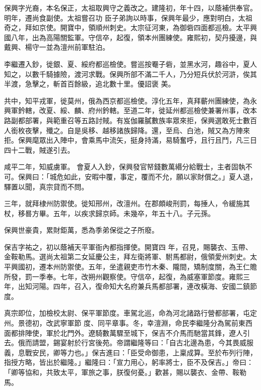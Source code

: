 \begin{pinyinscope}
 保興字光裔，本名保正，太祖取興守之義改之。建隆初，年十四，以蔭補供奉官。明年，遷尚食副使。太祖嘗召功
 臣子弟詢以時事，保興年最少，應對明白，太祖奇之，拜如京使。開寶中，領順州刺史。太宗征河東，為御砦四面都巡檢。太平興國八年，出為高陽關監軍。守信卒，起復，領本州團練使。雍熙初，契丹擾邊，與戴興、楊守一並為澶州前軍駐泊。



 李繼遷入鈔，徙銀、夏、綏府都巡檢使。嘗巡按罨子砦，並黑水河，趣谷中，夏人知之，以數千騎據險，渡河求戰。保興所部不滿二千人，乃分短兵伏於河滸，俟其半渡，急擊之，斬首百餘級，追北數十里。優詔褒
 美。



 共中，知平戎軍，徙莫州，俄為西京都巡檢使。淳化五年，真拜蘄州團練使，為永興軍鈐轄，改夏、綏、麟、府州鈐轄。至道二年，徙延州都巡檢使兼署州事，改本路副都部署，與範重召等五路討賊。有岌伽羅膩數族率眾來拒，保興選敢死士數百人銜枚夜擊，殲之。自是吳移、越移諸族歸降。還，至烏、白池，賊又為方陣來拒。保興麾眾出入陣中，會乘馬中流矢，挺身持滿，易騎奮呼，且行且鬥，凡三日四十二戰，賊遂引去。



 咸平二年，知威虜軍。
 會夏人入鈔，保興發官帑錢數萬緡分給戰士，主者固執不可。保興曰：「城危如此，安暇中覆，事定，覆而不允，願以家財償之。」夏人退，驛置以聞，真宗貸而不問。



 三年，就拜棣州防禦使。徙知邢州，改澶州。在郡頗峻刑罰，每捶人，令緩施其杖，移晷方畢。五年，以疾求歸京師。未幾卒，年五十八。子元孫。



 保興世豪貴，累財鉅萬，悉為季弟保從之子所廢。



 保吉字祐之，初以蔭補天平軍衙內都指揮使。開寶四
 年，召見，賜襲衣、玉帶、金鞍勒馬。選尚太祖第二女延慶公主，拜左衛將軍、駙馬都尉，俄領愛州刺史。太平興國初，遷本州防禦使。五年，坐遣親吏市竹木秦、隴間，矯制度關，為王仁贍所發，罰一季奉。七年，改朔州觀察使。守信卒，起復，為威塞軍節度。雍熙三年，出知河陽。四年，召入，復命知大名府兼兵馬都部署，連改橫海、安國二鎮節度。



 真宗即位，加檢校太尉、保平軍節度。車駕北巡，命為河北諸路行營都部署，屯定州。景德初，改武寧軍節
 度、同平章事。冬，幸澶淵，命民李繼隆分為駕前東西面都排陣使，軍於北門外。遼騎數萬驟至城下，保吉不介馬而馳當其鋒，遼人引去。俄而請盟，錫宴射於行宮後苑。帝謂繼隆等曰：「自古北邊為患，今其畏威服義，息戰安民，卿等力也。」保吉進曰：「臣受命御患，上稟成算。至於布列行陣，指授方略，皆出於繼隆。」繼隆曰：「宣力用心，躬率將士，臣不及保吉。」帝曰：「卿等協和，共致太平，軍旅之事，朕復何憂。」歡甚，賜以襲衣、金帶、鞍勒馬。




\end{pinyinscope}

